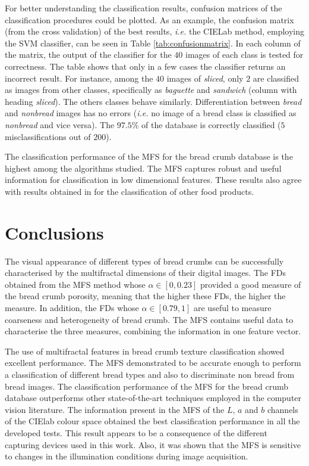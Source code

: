 \documentclass[twocolumn]{bmcart}%
\begin{document}
For better understanding the classification results, confusion matrices of the classification procedures could be plotted. As an example, the confusion matrix (from the cross validation) of the best results, {\em i.e.} the CIELab method, employing the SVM classifier, can be seen in Table \ref{tab:confusionmatrix}. In each column of the matrix, the output of the classifier for the $40$ images of each class is tested for correctness. The table shows that only in a few cases the classifier returns an incorrect result. For instance, among the $40$ images of {\em sliced}, only $2$ are  classified as images from other classes, specifically as {\em baguette} and {\em sandwich} (column with heading {\em sliced}). The others classes behave similarly. Differentiation between {\em bread} and {\em nonbread} images has no errors ({\em i.e.} no image of a bread class is classified as {\em nonbread} and vice versa). The $97.5\%$ of the database is correctly classified ($5$ misclassifications out of $200$).

The classification performance of the MFS for the bread crumb database is the highest a\-mong the algorithms studied. The MFS captures robust and useful information for classification in low dimensional features. These results also agree with results obtained in \cite{Bosch2011} for the classification of other food products.



\section{Conclusions}
\label{sec:11}
The visual appearance of different types of bread crumbs can be successfully characterised by the multifractal dimensions of their digital images. The FDs obtained from the MFS method whose $\alpha \in [0,0.23]$ provided a good measure of the bread crumb porosity, meaning that the higher these FDs, the higher the measure. In addition, the FDs whose $\alpha \in [0.79,1]$ are useful to measure coarseness and heterogeneity of bread crumb. The MFS contains useful data to characterise the three measures, combining the information in one feature vector.

The use of multifractal features in bread crumb texture classification showed excellent performance. The MFS de\-monstrated to be accurate enough to perform a classification of different bread types and also to discriminate non bread from bread images. The classification performance of the MFS for the bread crumb database outperforms other state-of-the-art techniques employed in the computer vision literature. The information present in the MFS of the $L$, $a$ and $b$ channels of the CIElab colour space obtained the best classification performance in all the developed tests. This result appears to be a consequence of the different capturing devices used in this work. Also, it was shown that the MFS is sensitive to changes in the illumination conditions during image acquisition.
\end{document}
